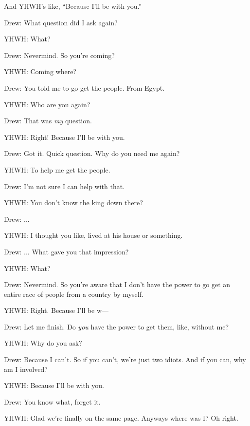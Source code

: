 {
}
{
}
{
	And YHWH's like, ``Because I'll be with you.''

	\begin{midrash}

	Drew: What question did I ask again?

	YHWH: What?

	Drew: Nevermind. So you're coming?

	YHWH: Coming where?

	Drew: You told me to go get the people. From Egypt.

	YHWH: Who are you again?
	
	Drew: That was \textsl{my} question.
	
	YHWH: Right! Because I'll be with you.

	Drew: Got it. Quick question. Why do you need me again?

	YHWH: To help me get the people.

	Drew: I'm not sure I can help with that.
	
	YHWH: You don't know the king down there?
	
	Drew: ...
	
	YHWH: I thought you like, lived at his house or something.
	
	Drew: ... What gave you that impression?
	
	YHWH: What?

	Drew: Nevermind. So you're aware that I don't have the power to go
		  get an entire race of people from a country by myself.

	YHWH: Right. Because I'll be w---

	Drew: Let me finish. Do \textsl{you} have the power to get them, like, without me?

	YHWH: Why do you ask?

	Drew: Because I can't. So if you can't, we're just two idiots. And if you can, why am I involved?

	YHWH: Because I'll be with you.

	Drew: You know what, forget it.

	YHWH: Glad we're finally on the same page. Anyways where was I? Oh right.


\end{midrash}}
